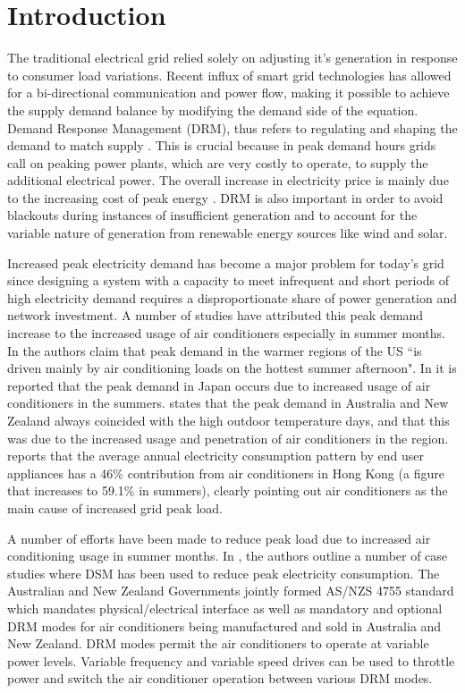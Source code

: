 \documentclass[10pt,twocolumn,twoside]{IEEEtran}
\begin{document}
\section{Introduction}
The traditional electrical grid relied solely on adjusting it's generation in response to consumer load variations. Recent influx of smart grid technologies has allowed for a bi-directional communication and power flow, making it possible to achieve the supply demand balance by modifying the demand side of the equation. Demand Response Management (DRM), thus refers to regulating and shaping the demand to match supply \cite{DRM_1, DRM_2, DRM_3, neww1, neww2, neww3, neww4, neww5}. This is crucial because in peak demand hours grids call on peaking power plants, which are very costly to operate, to supply the additional electrical power. The overall increase in electricity price is mainly due to the increasing cost of peak energy \cite{elec_price1, elec_price3}. DRM is also important in order to avoid blackouts during instances of insufficient generation and to account for the variable nature of generation from renewable energy sources like wind and solar. 

Increased peak electricity demand has become a major problem for today's grid since designing a system with a capacity to meet infrequent and short periods of high electricity demand requires a disproportionate share of power generation and network investment. A number of studies have attributed this peak demand increase to the increased usage of air conditioners especially in summer months. In \cite{koomey} the authors claim that peak demand in the warmer regions of the US ``is driven mainly by air conditioning loads on the hottest summer afternoon". In \cite{tokyo} it is reported that the peak demand in Japan occurs due to increased usage of air conditioners in the summers. \cite{ees} states that the peak demand in Australia and New Zealand always coincided with the high outdoor temperature days, and that this was due to the increased usage and penetration of air conditioners in the region. \cite{hongkong} reports that the average annual electricity consumption pattern by end user appliances has a 46\% contribution from air conditioners in Hong Kong (a figure that increases to 59.1\% in summers), clearly pointing out air conditioners as the main cause of increased grid peak load.

A number of efforts have been made to reduce peak load due to increased air conditioning usage in summer months. In \cite{survey}, the authors outline a number of case studies where DSM has been used to reduce peak electricity consumption. The Australian and New Zealand Governments jointly formed AS/NZS 4755 standard \cite{aus_stand} which mandates physical/electrical interface as well as mandatory and optional DRM modes for air conditioners being manufactured and sold in Australia and New Zealand. DRM modes permit the air conditioners to operate at variable power levels. Variable frequency and variable speed drives can be used to throttle power and switch the air conditioner operation between various DRM modes. 
\end{document}
